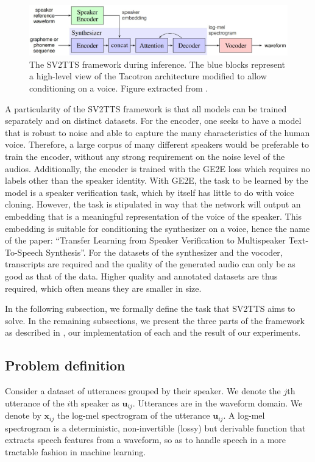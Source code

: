 \documentclass[a4paper, oneside, 12pt, english]{article}
\begin{document}
\begin{figure}[h]
	\centering
	\includegraphics[width=\linewidth]{images/sv2tts_framework.jpg}
	\caption{The SV2TTS framework during inference. The blue blocks represent a high-level view of the Tacotron architecture modified to allow conditioning on a voice. Figure extracted from \citep{SV2TTS}.}
	\label{sv2tts_framework}
\end{figure}

A particularity of the SV2TTS framework is that all models can be trained separately and on distinct datasets. For the encoder, one seeks to have a model that is robust to noise and able to capture the many characteristics of the human voice. Therefore, a large corpus of many different speakers would be preferable to train the encoder, without any strong requirement on the noise level of the audios. Additionally, the encoder is trained with the GE2E loss which requires no labels other than the speaker identity. With GE2E, the task to be learned by the model is a speaker verification task, which by itself has little to do with voice cloning. However, the task is stipulated in way that the network will output an embedding that is a meaningful representation of the voice of the speaker. This embedding is suitable for conditioning the synthesizer on a voice, hence the name of the paper: ``Transfer Learning from Speaker Verification to Multispeaker Text-To-Speech Synthesis''. For the datasets of the synthesizer and the vocoder, transcripts are required and the quality of the generated audio can only be as good as that of the data. Higher quality and annotated datasets are thus required, which often means they are smaller in size.

In the following subsection, we formally define the task that SV2TTS aims to solve. In the remaining subsections, we present the three parts of the framework as described in \citep{SV2TTS}, our implementation of each and the result of our experiments.

\subsection{Problem definition} \label{problem_definition}
\newcommand{\vx}{\mathbf{x}}
\newcommand{\vu}{\mathbf{u}}
\newcommand{\ve}{\mathbf{e}}
\newcommand{\vt}{\mathbf{t}}
\newcommand{\vc}{\mathbf{c}}
\newcommand{\vw}{\mathbf{w}}
\newcommand{\ms}{\mathbf{S}}
\newcommand{\enc}{\mathcal{E}}
\newcommand{\syn}{\mathcal{S}}
\newcommand{\voc}{\mathcal{V}}
Consider a dataset of utterances grouped by their speaker. We denote the $j$th utterance of the $i$th speaker as $\vu_{ij}$. Utterances are in the waveform domain. We denote by $\vx_{ij}$ the log-mel spectrogram of the utterance $\vu_{ij}$. A log-mel spectrogram is a deterministic, non-invertible (lossy) but derivable function that extracts speech features from a waveform, so as to handle speech in a more tractable fashion in machine learning.
\end{document}
